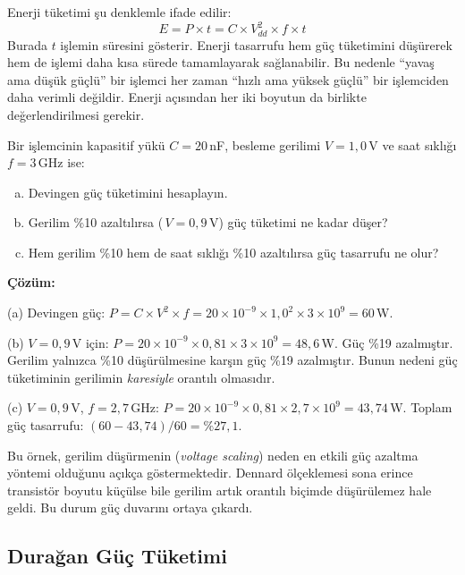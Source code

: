 Enerji tüketimi şu denklemle ifade edilir:
\begin{equation}
E = P \times t = C \times V_{dd}^2 \times f \times t
\label{eq:enerji}
\end{equation}
Burada $t$ işlemin süresini gösterir. Enerji tasarrufu hem güç tüketimini düşürerek hem de işlemi daha kısa sürede tamamlayarak sağlanabilir. Bu nedenle ``yavaş ama düşük güçlü'' bir işlemci her zaman ``hızlı ama yüksek güçlü'' bir işlemciden daha verimli değildir. Enerji açısından her iki boyutun da birlikte değerlendirilmesi gerekir.

\begin{ornek}[1.5]
\label{orn:guc-hesaplama}
Bir işlemcinin kapasitif yükü $C = 20$\,nF, besleme gerilimi $V = 1{,}0$\,V ve saat sıklığı $f = 3$\,GHz ise:
\begin{enumerate}[(a)]
\item Devingen güç tüketimini hesaplayın.
\item Gerilim \%10 azaltılırsa (\,$V = 0{,}9$\,V) güç tüketimi ne kadar düşer?
\item Hem gerilim \%10 hem de saat sıklığı \%10 azaltılırsa güç tasarrufu ne olur?
\end{enumerate}

\textbf{Çözüm:}

(a) Devingen güç: $P = C \times V^2 \times f = 20 \times 10^{-9} \times 1{,}0^2 \times 3 \times 10^{9} = 60$\,W.

(b) $V = 0{,}9$\,V için: $P = 20 \times 10^{-9} \times 0{,}81 \times 3 \times 10^{9} = 48{,}6$\,W. Güç \%19 azalmıştır. Gerilim yalnızca \%10 düşürülmesine karşın güç \%19 azalmıştır. Bunun nedeni güç tüketiminin gerilimin \emph{karesiyle} orantılı olmasıdır.

(c) $V = 0{,}9$\,V, $f = 2{,}7$\,GHz: $P = 20 \times 10^{-9} \times 0{,}81 \times 2{,}7 \times 10^{9} = 43{,}74$\,W. Toplam güç tasarrufu: $(60 - 43{,}74)/60 = \%27{,}1$.

Bu örnek, gerilim düşürmenin (\emph{voltage scaling}) neden en etkili güç azaltma yöntemi olduğunu açıkça göstermektedir. Dennard ölçeklemesi sona erince transistör boyutu küçülse bile gerilim artık orantılı biçimde düşürülemez hale geldi. Bu durum güç duvarını ortaya çıkardı.
\end{ornek}


\subsection{Durağan Güç Tüketimi}
\label{sec:duragan-guc}

